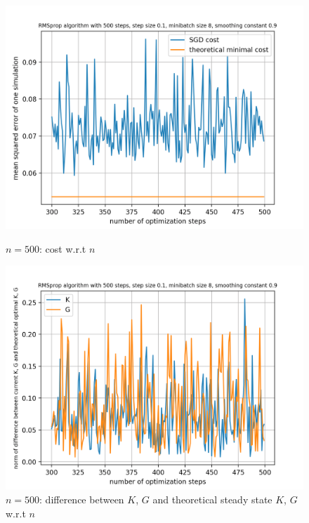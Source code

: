 \documentclass{article}
\begin{document}
\begin{figure}[h!]
	\centering
	\begin{minipage}[t]{.28\paperwidth}
		\centering
		\includegraphics[width=1.0\textwidth]{Figures/last200_n500.png}
		\caption{$n = 500$: cost w.r.t $n$}
	\end{minipage}%
	\begin{minipage}[t]{.28\paperwidth}
		\centering
		\includegraphics[width=1.0\textwidth]{Figures/d_last200_n500.png}
		\caption{$n = 500$: difference between $K$, $G$ and theoretical steady state $K$, $G$ w.r.t $n$}
	\end{minipage}%
	\begin{minipage}[t]{.28\paperwidth}
		\centering

\end{minipage}
\end{figure}
\end{document}
